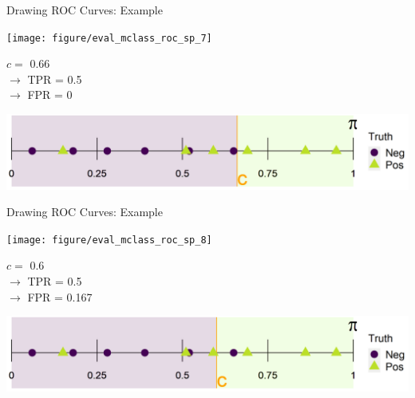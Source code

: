 
\begin{vbframe}{Drawing ROC Curves: Example}
	
	\begin{knitrout}\scriptsize
		\color{fgcolor}
		
		{
			\texttt{[image: figure/eval\_mclass\_roc\_sp\_7]}
		}
		
	\end{knitrout}
	
	\vfill
	
	\begin{minipage}[b]{0.3\textwidth}
		$c =$ 0.66\\ 
		$\rightarrow$ TPR = 0.5 \\
		$\rightarrow$ FPR = 0
	\end{minipage}%
	\begin{minipage}[b]{0.7\textwidth}
		\includegraphics{figure/roc_horizontal_step_3} 
	\end{minipage}
	
\end{vbframe}


\begin{vbframe}{Drawing ROC Curves: Example}
	
	\begin{knitrout}\scriptsize
		\color{fgcolor}
		
		{
			\texttt{[image: figure/eval\_mclass\_roc\_sp\_8]}
		}
		
	\end{knitrout}
	
	\vfill
	
	\begin{minipage}[b]{0.3\textwidth}
		$c =$ 0.6\\ 
		$\rightarrow$ TPR = 0.5 \\
		$\rightarrow$ FPR = 0.167
	\end{minipage}%
	\begin{minipage}[b]{0.7\textwidth}
		\includegraphics{figure/roc_horizontal_step_4} 
	\end{minipage}
	
\end{vbframe}

